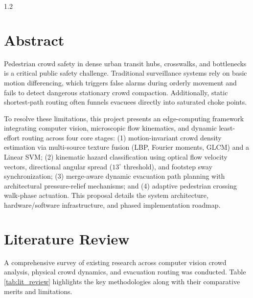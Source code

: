 \documentclass[12pt,a4paper]{article}
\begin{document}
\begin{spacing}{1.2}
\tableofcontents
\end{spacing}

\setcounter{page}{1}

\section{Abstract}
Pedestrian crowd safety in dense urban transit hubs, crosswalks, and bottlenecks is a critical public safety challenge. Traditional surveillance systems rely on basic motion differencing, which triggers false alarms during orderly movement and fails to detect dangerous stationary crowd compaction. Additionally, static shortest-path routing often funnels evacuees directly into saturated choke points.

To resolve these limitations, this project presents an edge-computing framework integrating computer vision, microscopic flow kinematics, and dynamic least-effort routing across four core stages: (1) motion-invariant crowd density estimation via multi-source texture fusion (LBP, Fourier moments, GLCM) and a Linear SVM; (2) kinematic hazard classification using optical flow velocity vectors, directional angular spread ($13^\circ$ threshold), and footstep sway synchronization; (3) merge-aware dynamic evacuation path planning with architectural pressure-relief mechanisms; and (4) adaptive pedestrian crossing walk-phase actuation. This proposal details the system architecture, hardware/software infrastructure, and phased implementation roadmap.

\section{Literature Review}
A comprehensive survey of existing research across computer vision crowd analysis, physical crowd dynamics, and evacuation routing was conducted. Table \ref{tab:lit_review} highlights the key methodologies along with their comparative merits and limitations.
\end{document}
